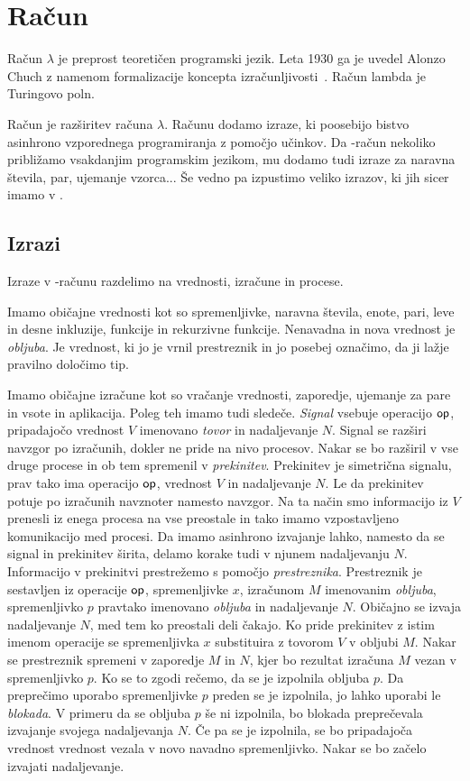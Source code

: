 \section{Račun \lae{}}\label{sec:lae}

Račun $\lambda$ je preprost teoretičen programski jezik. Leta 1930 ga je uvedel Alonzo Chuch z namenom formalizacije koncepta izračunljivosti~\cite{rojas2015tutorial}. Račun lambda je Turingovo poln.


Račun \lae{} je razširitev računa $\lambda$. Računu \lae{} dodamo izraze, ki poosebijo bistvo asinhrono vzporednega programiranja z pomočjo učinkov. Da \lae{}-račun nekoliko približamo vsakdanjim programskim jezikom, mu dodamo tudi izraze za  naravna števila, par, ujemanje vzorca... Še vedno pa izpustimo veliko izrazov, ki jih sicer imamo v \aeff{}.


\subsection{Izrazi}

Izraze v \lae{}-računu razdelimo na vrednosti, izračune in procese. 


Imamo običajne vrednosti kot so spremenljivke, naravna števila, enote, pari, leve in desne inkluzije, funkcije in rekurzivne funkcije.
Nenavadna in nova vrednost je \emph{obljuba}. Je vrednost, ki jo je vrnil prestreznik in jo posebej označimo, da ji lažje pravilno določimo tip.

Imamo običajne izračune kot so vračanje vrednosti, zaporedje, ujemanje za pare in vsote in aplikacija.
Poleg teh imamo tudi sledeče.
\emph{Signal} vsebuje operacijo $\mathsf{op}$, pripadajočo vrednost $V$ imenovano \emph{tovor} in nadaljevanje $N$. Signal se razširi navzgor po izračunih, dokler ne pride na nivo procesov. Nakar se bo razširil v vse druge procese in ob tem spremenil v \emph{prekinitev}. Prekinitev je simetrična signalu, prav tako ima operacijo $\mathsf{op}$, vrednost $V$ in nadaljevanje $N$. Le da prekinitev potuje po izračunih navznoter namesto navzgor. Na ta način smo informacijo iz $V$ prenesli iz enega procesa na vse preostale in tako imamo vzpostavljeno komunikacijo med procesi. Da imamo asinhrono izvajanje lahko, namesto da se signal in prekinitev širita, delamo korake tudi v njunem nadaljevanju $N$.
Informacijo v prekinitvi prestrežemo s pomočjo \emph{prestreznika}. Prestreznik je sestavljen iz operacije $\mathsf{op}$, spremenljivke $x$, izračunom $M$ imenovanim \emph{obljuba}, spremenljivko $p$ pravtako imenovano \emph{obljuba} in nadaljevanje $N$. Običajno se izvaja nadaljevanje $N$, med tem ko preostali deli čakajo.
Ko pride prekinitev z istim imenom operacije se spremenljivka $x$ substituira z tovorom $V$ v obljubi $M$. Nakar se prestreznik spremeni v zaporedje $M$ in $N$, kjer bo rezultat izračuna $M$ vezan v spremenljivko $p$. Ko se to zgodi rečemo, da se je izpolnila obljuba $p$.
Da preprečimo uporabo spremenljivke $p$ preden se je izpolnila, jo lahko uporabi le \emph{blokada}. V primeru da se obljuba $p$ še ni izpolnila, bo blokada preprečevala izvajanje svojega nadaljevanja $N$. Če pa se je izpolnila, se bo pripadajoča vrednost vrednost vezala v novo navadno spremenljivko. Nakar se bo začelo izvajati nadaljevanje.


